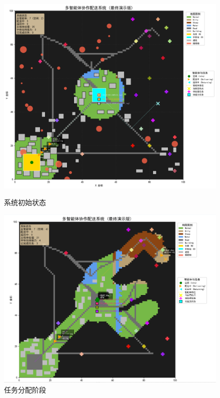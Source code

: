 \documentclass[12pt,a4paper]{article}
\begin{document}
\begin{figure}[h]
    \centering
    \begin{minipage}[t]{0.3\textwidth}
        \centering
        \includegraphics[width=\textwidth]{visualization_snapshots/1.png}
        \caption{系统初始状态}
    \end{minipage}
    \hfill
    \begin{minipage}[t]{0.3\textwidth}
        \centering
        \includegraphics[width=\textwidth]{visualization_snapshots/2.png}
        \caption{任务分配阶段}
    \end{minipage}

\end{figure}
\end{document}
